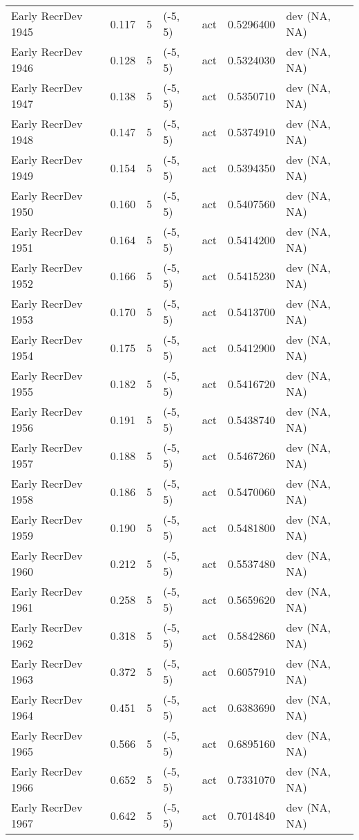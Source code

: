\documentclass[11pt,
  english,
  letterpaper,
]{article}
\begin{document}
\begin{landscape}
\begin{longtable}[t]{>{\raggedright\arraybackslash}p{7cm}lllll>{\raggedright\arraybackslash}p{4cm}}
Early RecrDev 1945 & 0.117 & 5 & (-5, 5) & act & 0.5296400 & dev (NA, NA)\\
Early RecrDev 1946 & 0.128 & 5 & (-5, 5) & act & 0.5324030 & dev (NA, NA)\\
Early RecrDev 1947 & 0.138 & 5 & (-5, 5) & act & 0.5350710 & dev (NA, NA)\\
Early RecrDev 1948 & 0.147 & 5 & (-5, 5) & act & 0.5374910 & dev (NA, NA)\\
Early RecrDev 1949 & 0.154 & 5 & (-5, 5) & act & 0.5394350 & dev (NA, NA)\\
Early RecrDev 1950 & 0.160 & 5 & (-5, 5) & act & 0.5407560 & dev (NA, NA)\\
Early RecrDev 1951 & 0.164 & 5 & (-5, 5) & act & 0.5414200 & dev (NA, NA)\\
Early RecrDev 1952 & 0.166 & 5 & (-5, 5) & act & 0.5415230 & dev (NA, NA)\\
Early RecrDev 1953 & 0.170 & 5 & (-5, 5) & act & 0.5413700 & dev (NA, NA)\\
Early RecrDev 1954 & 0.175 & 5 & (-5, 5) & act & 0.5412900 & dev (NA, NA)\\
Early RecrDev 1955 & 0.182 & 5 & (-5, 5) & act & 0.5416720 & dev (NA, NA)\\
Early RecrDev 1956 & 0.191 & 5 & (-5, 5) & act & 0.5438740 & dev (NA, NA)\\
Early RecrDev 1957 & 0.188 & 5 & (-5, 5) & act & 0.5467260 & dev (NA, NA)\\
Early RecrDev 1958 & 0.186 & 5 & (-5, 5) & act & 0.5470060 & dev (NA, NA)\\
Early RecrDev 1959 & 0.190 & 5 & (-5, 5) & act & 0.5481800 & dev (NA, NA)\\
Early RecrDev 1960 & 0.212 & 5 & (-5, 5) & act & 0.5537480 & dev (NA, NA)\\
Early RecrDev 1961 & 0.258 & 5 & (-5, 5) & act & 0.5659620 & dev (NA, NA)\\
Early RecrDev 1962 & 0.318 & 5 & (-5, 5) & act & 0.5842860 & dev (NA, NA)\\
Early RecrDev 1963 & 0.372 & 5 & (-5, 5) & act & 0.6057910 & dev (NA, NA)\\
Early RecrDev 1964 & 0.451 & 5 & (-5, 5) & act & 0.6383690 & dev (NA, NA)\\
Early RecrDev 1965 & 0.566 & 5 & (-5, 5) & act & 0.6895160 & dev (NA, NA)\\
Early RecrDev 1966 & 0.652 & 5 & (-5, 5) & act & 0.7331070 & dev (NA, NA)\\
Early RecrDev 1967 & 0.642 & 5 & (-5, 5) & act & 0.7014840 & dev (NA, NA)\\

\end{longtable}
\end{landscape}
\end{document}
